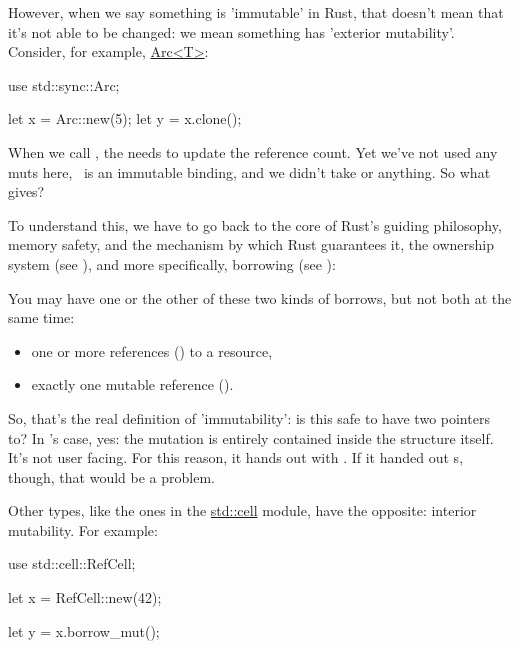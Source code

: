 However, when we say something is 'immutable' in Rust, that doesn't mean that it's not able to be changed: we mean something has 
'exterior mutability'. Consider, for example, \href{https://doc.rust-lang.org/std/sync/struct.Arc.html}{Arc<T>}:

\begin{rustc}
use std::sync::Arc;

let x = Arc::new(5);
let y = x.clone();
\end{rustc}

When we call , the  needs to update the reference count. Yet we've not used any muts here, \x\ is 
an immutable binding, and we didn't take  or anything. So what gives?

\blank

To understand this, we have to go back to the core of Rust's guiding philosophy, memory safety, and the mechanism by which Rust 
guarantees it, the ownership system (see ), and more specifically, borrowing (see 
):

\begin{myquote}
You may have one or the other of these two kinds of borrows, but not both at the same time:
\begin{itemize}
  \item{one or more references () to a resource,}
  \item{exactly one mutable reference ().}
\end{itemize}
\end{myquote}

So, that's the real definition of 'immutability': is this safe to have two pointers to? In 's case, yes: the mutation 
is entirely contained inside the structure itself. It's not user facing. For this reason, it hands out  with . 
If it handed out s, though, that would be a problem.

\blank

Other types, like the ones in the \href{https://doc.rust-lang.org/std/cell/}{std::cell} module, have the opposite: interior 
mutability. For example:

\begin{rustc}
use std::cell::RefCell;

let x = RefCell::new(42);

let y = x.borrow_mut();
\end{rustc}

